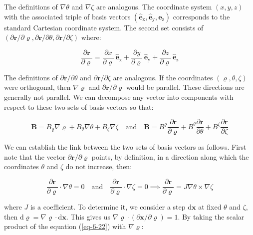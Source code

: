 The definitions of $\nabla\theta$ and $\nabla\zeta$ are analogous. The coordinate system $(x, y, z)$ with the associated triple of basis vectors $(\mathbf{\hat{e}}_\text{x}, \mathbf{\hat{e}}_\text{y}, \mathbf{\hat{e}}_\text{z})$ corresponds to the standard Cartesian coordinate system. The second set consists of $(\partial\mathbf{r}/\partial\varrho, \partial\mathbf{r}/\partial\theta, \partial\mathbf{r}/\partial\zeta)$ where:

\begin{equation}
    \frac{\partial\mathbf{r}}{\partial \varrho}=\frac{\partial x}{\partial\varrho}\,\mathbf{\hat{e}}_\text{x}+\frac{\partial y}{\partial\varrho}\,\mathbf{\hat{e}}_\text{y}+\frac{\partial z}{\partial\varrho}\,\mathbf{\hat{e}}_\text{z}
\end{equation}

The definitions of $\partial\mathbf{r}/\partial\theta$ and $\partial\mathbf{r}/\partial\zeta$ are analogous. If the coordinates $(\varrho, \theta, \zeta)$ were orthogonal, then $\nabla\varrho$ and $\partial\mathbf{r}/\partial\varrho$ would be parallel. These directions are generally not parallel. We can decompose any vector into components with respect to these two sets of basis vectors so that:

\begin{equation}
    \label{eq-6-21}
    \mathbf{B}=B_\varrho\nabla\varrho+B_\theta\nabla\theta+B_\zeta\nabla\zeta\quad\text{and}\quad\mathbf{B}=B^\varrho\frac{\partial\mathbf{r}}{\partial\varrho}+B^\theta\frac{\partial\mathbf{r}}{\partial\theta}+B^\zeta\frac{\partial\mathbf{r}}{\partial\zeta}
\end{equation}

We can establish the link between the two sets of basis vectors as follows. First note that the vector $\partial\mathbf{r}/\partial\varrho$ points, by definition, in a direction along which the coordinates $\theta$ and $\zeta$ do not increase, then:

\begin{equation}
    \label{eq-6-22}
    \frac{\partial\mathbf{r}}{\partial\varrho}\cdot\nabla\theta=0\quad\text{and}\quad\frac{\partial\mathbf{r}}{\partial\varrho}\cdot\nabla\zeta=0\implies\frac{\partial\mathbf{r}}{\partial\varrho}=J\nabla\theta\times\nabla\zeta
\end{equation}

where $J$ is a coefficient. To determine it, we consider a step $\mathrm{d}\mathbf{x}$ at fixed $\theta$ and $\zeta$, then $\mathrm{d}\varrho=\nabla\varrho\cdot\mathrm{d}\mathbf{x}$. This gives us $\nabla\varrho\cdot(\partial\mathbf{x}/\partial\varrho)=1$. By taking the scalar product of the equation (\ref{eq-6-22}) with $\nabla\varrho$:

